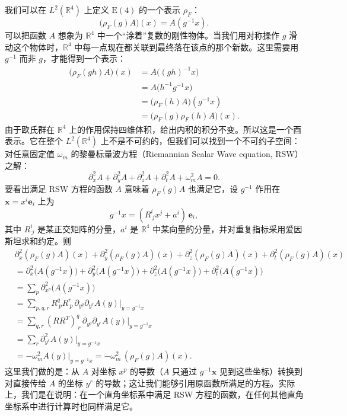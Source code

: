 我们可以在 $L^2(\mathbb{R}^4)$ 上定义 $\mathrm{E}(4)$ 的一个表示 $\rho_F$：
\[
\big(\rho_F(g)A\big)(x)=A(g^{-1}x).
\]
可以把函数 $A$ 想象为 $\mathbb{R}^4$ 中一个“涂着”复数的刚性物体。当我们用对称操作 $g$ 滑动这个物体时，$\mathbb{R}^4$ 中每一点现在都关联到最终落在该点的那个新数。这里需要用 $g^{-1}$ 而非 $g$，才能得到一个表示：
\begin{align*}
\big(\rho_F(gh)A\big)(x)
&=A\big((gh)^{-1}x\big)\\
&=A\big(h^{-1}g^{-1}x\big)\\
&=\big(\rho_F(h)A\big)(g^{-1}x)\\
&=\big(\rho_F(g)\rho_F(h)A\big)(x).
\end{align*}
由于欧氏群在 $\mathbb{R}^4$ 上的作用保持四维体积，给出内积的积分不变。所以这是一个酉表示。它在整个 $L^2(\mathbb{R}^4)$ 上不是不可约的，但我们可以找到一个不可约子空间：对任意固定值 $\omega_m$ 的黎曼标量波方程（Riemannian Scalar Wave equation, RSW）之解：
\begin{equation}
\partial_x^2 A+\partial_y^2 A+\partial_z^2 A+\partial_t^2 A+\omega_m^2 A=0. \tag{RSW}
\end{equation}
要看出满足 RSW 方程的函数 $A$ 意味着 $\rho_F(g)A$ 也满足它，设 $g^{-1}$ 作用在 $\mathbf{x}=x^i\mathbf{e}_i$ 上为
\[
g^{-1}x=(R^i_{\ j}x^j+a^i)\,\mathbf{e}_i,
\]
其中 $R^i_{\ j}$ 是某正交矩阵的分量，$a^i$ 是 $\mathbb{R}^4$ 中某向量的分量，并对重复指标采用爱因斯坦求和约定。则
\begin{align*}
&\partial_x^2(\rho_F(g)A)(x)+\partial_y^2(\rho_F(g)A)(x)
+\partial_z^2(\rho_F(g)A)(x)+\partial_t^2(\rho_F(g)A)(x)\\
&=\partial_x^2\big(A(g^{-1}x)\big)+\partial_y^2\big(A(g^{-1}x)\big)
+\partial_z^2\big(A(g^{-1}x)\big)+\partial_t^2\big(A(g^{-1}x)\big)\\
&=\sum_{p}\partial_{x^p}^2\big(A(g^{-1}x)\big)\\
&=\sum_{p,q,r}R^q_{\ p}R^r_{\ p}\,\partial_{y^q}\partial_{y^r}A(y)\Big|_{y=g^{-1}x}\\
&=\sum_{q,r}(RR^{T})^q_{\ r}\,\partial_{y^q}\partial_{y^r}A(y)\Big|_{y=g^{-1}x}\\
&=\sum_{r}\partial_{y^r}^2 A(y)\Big|_{y=g^{-1}x}\\
&=-\omega_m^2 A(y)\Big|_{y=g^{-1}x}
=-\omega_m^2\,(\rho_F(g)A)(x).
\end{align*}
这里我们做的是：从 $A$ 对坐标 $x^p$ 的导数（$A$ 只通过 $g^{-1}\mathbf{x}$ 见到这些坐标）转换到对直接传给 $A$ 的坐标 $y^r$ 的导数；这让我们能够引用原函数所满足的方程。实际上，我们是在说明：在一个直角坐标系中满足 RSW 方程的函数，在任何其他直角坐标系中进行计算时也同样满足它。

